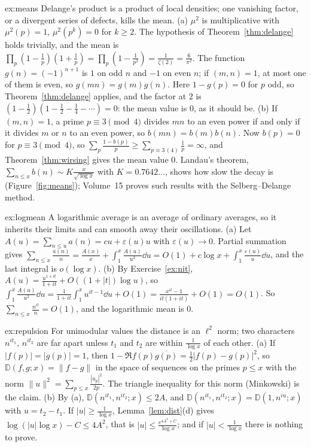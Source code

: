 \begin{solution}{ex:means}
\idea Delange's product is a product of local densities; one vanishing factor, or a divergent series of defects, kills the mean.
\writeup (a) $\mu^2$ is multiplicative with $\mu^2(p)=1$, $\mu^2(p^k)=0$ for $k\ge2$. The hypothesis of Theorem~\ref{thm:delange} holds trivially, and the mean is $\prod_p(1-\frac1p)(1+\frac1p)=\prod_p(1-\frac1{p^2})=\frac1{\zeta(2)}=\frac6{\pi^2}$. The function $g(n)=(-1)^{n+1}$ is $1$ on odd $n$ and $-1$ on even $n$; if $(m,n)=1$, at most one of them is even, so $g(mn)=g(m)g(n)$. Here $1-g(p)=0$ for $p$ odd, so Theorem~\ref{thm:delange} applies, and the factor at $2$ is $(1-\frac12)(1-\frac12-\frac14-\cdots)=0$: the mean value is $0$, as it should be.
(b) If $(m,n)=1$, a prime $p\equiv3\pmod4$ divides $mn$ to an even power if and only if it divides $m$ or $n$ to an even power, so $b(mn)=b(m)b(n)$. Now $b(p)=0$ for $p\equiv3\pmod4$, so $\sum_p\frac{1-b(p)}p\ge\sum_{p\equiv3\,(4)}\frac1p=\infty$, and Theorem~\ref{thm:wirsing} gives the mean value $0$. Landau's theorem, $\sum_{n\le x}b(n)\sim K\frac x{\sqrt{\log x}}$ with $K=0.7642\ldots$, shows how slow the decay is (Figure~\ref{fig:means}); Volume~15 proves such results with the Selberg--Delange method.
\end{solution}

\begin{solution}{ex:logmean}
\idea A logarithmic average is an average of ordinary averages, so it inherits their limits and can smooth away their oscillations.
\writeup (a) Let $A(u)=\sum_{n\le u}a(n)=cu+\varepsilon(u)u$ with $\varepsilon(u)\to0$. Partial summation gives $\sum_{n\le x}\frac{a(n)}n=\frac{A(x)}x+\int_1^x\frac{A(u)}{u^2}\dd u=O(1)+c\log x+\int_1^x\frac{\varepsilon(u)}u\dd u$, and the last integral is $o(\log x)$.
(b) By Exercise~\ref{ex:nit}, $A(u)=\frac{u^{1+it}}{1+it}+O((1+|t|)\log u)$, so $\int_1^x\frac{A(u)}{u^2}\dd u=\frac1{1+it}\int_1^xu^{it-1}\dd u+O(1)=\frac{x^{it}-1}{it(1+it)}+O(1)=O(1)$. So $\sum_{n\le x}\frac{n^{it}}n=O(1)$, and the logarithmic mean is $0$.
\end{solution}

\begin{solution}{ex:repulsion}
\idea For unimodular values the distance is an $\ell^2$ norm; two characters $n^{it_1}$, $n^{it_2}$ are far apart unless $t_1$ and $t_2$ are within $\frac1{\log x}$ of each other.
\writeup (a) If $|f(p)|=|g(p)|=1$, then $1-\Re f(p)\overline{g(p)}=\frac12|f(p)-g(p)|^2$, so $\mathbb D(f,g;x)=\|f-g\|$ in the space of sequences on the primes $p\le x$ with the norm $\|u\|^2=\sum_{p\le x}\frac{|u_p|^2}{2p}$. The triangle inequality for this norm (Minkowski) is the claim.
(b) By (a), $\mathbb D(n^{it_1},n^{it_2};x)\le2A$, and $\mathbb D(n^{it_1},n^{it_2};x)=\mathbb D(1,n^{iu};x)$ with $u=t_2-t_1$. If $|u|\ge\frac1{\log x}$, Lemma~\ref{lem:dist}(d) gives $\log(|u|\log x)-C\le4A^2$, that is $|u|\le\frac{e^{4A^2+C}}{\log x}$; and if $|u|<\frac1{\log x}$ there is nothing to prove.
\end{solution}

